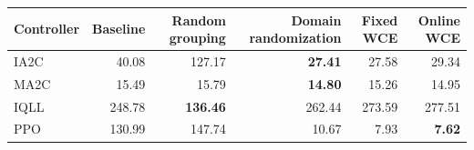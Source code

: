 \begin{tabular}{lrrrrr}
\hline
Controller & Baseline & Random grouping & Domain randomization & Fixed WCE & Online WCE \\
\hline
IA2C & 40.08 & 127.17 & \textbf{27.41} & 27.58 & 29.34 \\
MA2C & 15.49 & 15.79 & \textbf{14.80} & 15.26 & 14.95 \\
IQLL & 248.78 & \textbf{136.46} & 262.44 & 273.59 & 277.51 \\
PPO & 130.99 & 147.74 & 10.67 & 7.93 & \textbf{7.62} \\
\hline
\end{tabular}
